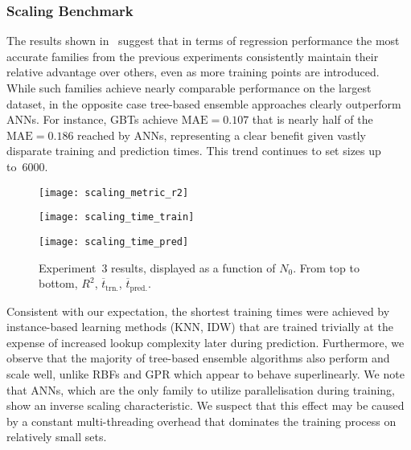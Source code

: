 \subsubsection{Scaling Benchmark}
\label{sec:res-exp3}

The results shown in~ suggest that in terms of regression
performance the most accurate families from the previous experiments
consistently maintain their relative advantage over others, even as
more training points are introduced. While such families achieve nearly comparable
performance on the largest dataset, in the opposite case tree-based ensemble
approaches clearly outperform ANNs. For instance, GBTs achieve
$\text{MAE}=\num{0.107}$ that is nearly half of the $\text{MAE}=\num{0.186}$
reached by ANNs, representing a clear benefit given vastly disparate training
and prediction times. This trend continues to set sizes up to~\num{6000}.

\begin{figure}
	\centering
	\hspace*{-0.1\columnwidth}
	\texttt{[image: scaling\_metric\_r2]}
	
	\vfill

	\hspace*{-0.1\columnwidth}
	\texttt{[image: scaling\_time\_train]}
	
	\vfill

	\hspace*{-0.1\columnwidth}
	\texttt{[image: scaling\_time\_pred]}
	\caption{Experiment~3 results, displayed as a function of $N_0$. From top to bottom, $R^2$,
	$\overline{t}_{\text{trn.}}$, $\overline{t}_{\text{pred.}}$.}
	\label{fig:scaling}
\end{figure}

Consistent with our expectation, the shortest training times were achieved by
instance-based learning methods (KNN, IDW) that
are trained trivially at the expense of increased lookup complexity later during prediction.
Furthermore, we observe that the majority of tree-based ensemble algorithms also perform
and scale well, unlike RBFs and GPR which appear to behave superlinearly. We note that ANNs,
which are the only family to utilize parallelisation during training, show an
inverse scaling characteristic. We suspect that this effect may be caused
by a constant multi-threading overhead that dominates the training process
on relatively small sets.


